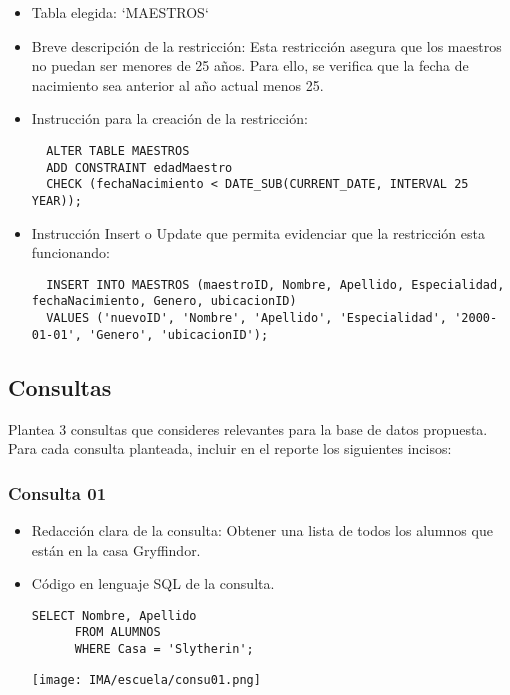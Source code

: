 \begin{itemize}
  \item Tabla elegida: `MAESTROS`
  \item Breve descripción de la restricción: Esta restricción asegura que los maestros no puedan ser menores de 25 años. Para ello, se verifica que la fecha de nacimiento sea anterior al año actual menos 25.
  \item Instrucción para la creación de la restricción:
  \begin{verbatim}
  ALTER TABLE MAESTROS
  ADD CONSTRAINT edadMaestro
  CHECK (fechaNacimiento < DATE_SUB(CURRENT_DATE, INTERVAL 25 YEAR));
  \end{verbatim}
  \item Instrucción Insert o Update que permita evidenciar que la restricción esta funcionando:
  \begin{verbatim}
  INSERT INTO MAESTROS (maestroID, Nombre, Apellido, Especialidad, fechaNacimiento, Genero, ubicacionID)
  VALUES ('nuevoID', 'Nombre', 'Apellido', 'Especialidad', '2000-01-01', 'Genero', 'ubicacionID');
  \end{verbatim}
\end{itemize}

\subsection{Consultas}

Plantea 3 consultas que consideres relevantes para la base de datos propuesta. Para cada consulta planteada, incluir en el reporte los siguientes incisos:

\subsubsection*{Consulta 01}
\begin{itemize}
    \item Redacción clara de la consulta: Obtener una lista de todos los alumnos que están en la casa Gryffindor.
    \item Código en lenguaje SQL de la consulta.
    
    \begin{lstlisting}[caption={Tablas para la BdDatos}, label={lst:sql_estadios}]
      SELECT Nombre, Apellido
      FROM ALUMNOS
      WHERE Casa = 'Slytherin';
    \end{lstlisting}    

    \begin{center}
      \texttt{[image: IMA/escuela/consu01.png]}
    \end{center}
    
\end{itemize}


